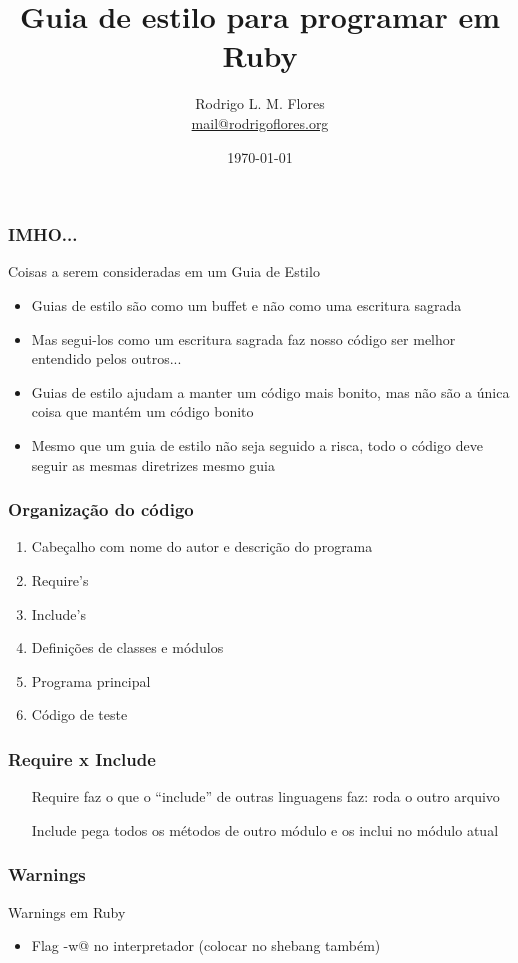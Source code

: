 \documentclass{beamer}
\title{Guia de estilo para programar em Ruby}
\author{Rodrigo L. M. Flores \\ \url{mail@rodrigoflores.org}}
\institute{Projeto Archlinux-BR}
\begin{document}
\date{\today}

\frame{\titlepage}

\begin{frame}
    \frametitle{IMHO...}
    \begin{block}{Coisas a serem consideradas em um Guia de Estilo}
        \begin{itemize}
            \item Guias de estilo são como um buffet e não como uma escritura sagrada
            \item Mas segui-los como um escritura sagrada faz nosso código ser melhor entendido pelos outros...
            \item Guias de estilo ajudam a manter um código mais bonito, mas não são a única coisa que mantém um código bonito
            \item Mesmo que um guia de estilo não seja seguido a risca, todo o código deve seguir as mesmas diretrizes mesmo guia
        \end{itemize}
    \end{block}
\end{frame}

\begin{frame}
    \frametitle{Organização do código}
    \begin{enumerate}
        \item Cabeçalho com nome do autor e descrição do programa
        \item Require's
        \item Include's
        \item Definições de classes e módulos
        \item Programa principal
        \item Código de teste
    \end{enumerate}
\end{frame}


\begin{frame}
    \frametitle{Require x Include}
    \begin{itemize}
        \item[Require] faz o que o ``include'' de outras linguagens faz: roda o outro arquivo
        \item[Include] pega todos os métodos de outro módulo e os inclui no módulo atual
    \end{itemize}
\end{frame}

\begin{frame}[fragile]
    \frametitle{Warnings}
    \begin{block}{Warnings em Ruby}
        \begin{itemize}
            \item Flag \verb@-w@ no interpretador (colocar no shebang também)
        \end{itemize}
    \end{block}
\end{frame}
\end{document}
